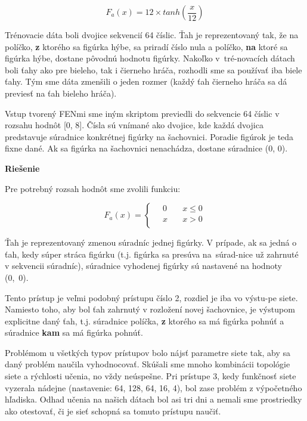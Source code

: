 \documentclass[12pt]{article}
\newcommand{\mysmallsection}[1]{\vspace{0.5cm}{\centering\large\textbf{#1}\\}\normalsize\vspace{0.5cm}}
\begin{document}
\begin{equation}
F_a(x)=12 \times tanh(\frac{x}{12})
\end{equation}

Trénovacie dáta boli dvojice sekvencií 64 číslic. Ťah je reprezentovaný tak, že na políčko, \textbf{z} ktorého sa figúrka hýbe, sa priradí číslo nula a políčko, \textbf{na} ktoré sa figúrka hýbe, dostane pôvodnú hodnotu figúrky. Nakoľko v~tré-novacích dátach boli ťahy ako pre bieleho, tak i čierneho hráča, rozhodli sme sa používať iba biele ťahy. Tým sme dáta zmenšili o jeden rozmer (každý ťah čierneho hráča sa dá previesť na ťah bieleho hráča).

\newpage

\mysmallsection{Prístup 2}

Vstup tvorený FENmi sme iným skriptom previedli do sekvencie 64 číslic v rozsahu hodnôt [0, 8]. Čísla sú vnímané ako dvojice, kde každá dvojica predstavuje súradnice konkrétnej figúrky na šachovnici. Poradie figúrok je teda fixne dané. Ak sa figúrka na šachovnici nenachádza, dostane súradnice (0, 0).

{\vspace*{0.5cm}\centering\textbf{Riešenie}\\}

Pre potrebný rozsah hodnôt sme zvolili funkciu:

\[ F_a(x) =
  \begin{cases}
    \quad 0  & \quad x \leq 0 \\
    \quad x  & \quad x > 0\\
  \end{cases}
\]

Ťah je reprezentovaný zmenou súradníc jednej figúrky. V prípade, ak sa jedná o ťah, kedy súper stráca figúrku (t.j. figúrka sa presúva na~súrad-nice už zahrnuté v sekvencii súradníc), súradnice vyhodenej figúrky sú nastavené na hodnoty (0,~0).

\mysmallsection{Prístup 3}

Tento prístup je veľmi podobný prístupu číslo 2, rozdiel je iba vo výstu-pe siete. Namiesto toho, aby bol ťah zahrnutý v rozložení novej šachovnice, je výstupom explicitne daný ťah, t.j. súradnice políčka, \textbf{z} ktorého sa má figúrka pohnúť a súradnice \textbf{kam} sa má figúrka pohnúť.

\mysmallsection{Výsledky}

Problémom u všetkých typov prístupov bolo nájsť parametre siete tak, aby sa daný problém naučila vyhodnocovať. Skúšali sme mnoho kombinácii topológie siete a rýchlosti učenia, no vždy neúspešne. Pri prístupe 3, kedy funkčnosť siete vyzerala nádejne (nastavenie: 64, 128, 64, 16, 4), bol zase problém z výpočetného hľadiska. Odhad učenia na našich dátach bol asi tri dni a nemali sme prostriedky ako otestovať, či je sieť schopná sa tomuto prístupu naučiť.
\end{document}
